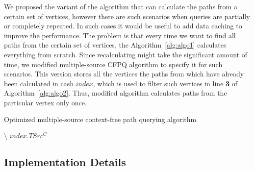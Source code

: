 We proposed the variant of the algorithm that can calculate the paths from a certain set of vertices, however there are such scenarios when queries are partially or completely repeated. In such cases it would be useful to add data caching to improve the performance. The problem is that every time we want to find all paths from the certain set of vertices, the Algorithm~\ref{alg:algo1} calculates everything from scratch. Since recalculating might take the significant amount of time, we modified multiple-source CFPQ algorithm to specify it for such scenarios. This version stores all the vertices the paths from which have already been calculated in cash $index$, which is used to filter such vertices in line \textbf{3} of Algorithm~\ref{alg:algo2}. Thus, modified algorithm calculates paths from the particular vertex only once.
\begin{algorithm}
\begin{algorithmic}[1]
\caption{Optimized multiple-source context-free path querying algorithm}
\label{alg:algo2}

    \EndFor


             $\setminus$ $index.TSrc^C$
        \EndFor
    \EndWhile
\EndFunction


\end{algorithmic}
\end{algorithm}

\subsection{Implementation Details}

